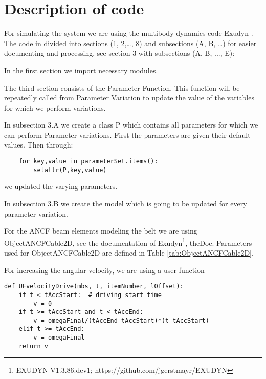 \section{Description of code}
For simulating the system we are using the multibody dynamics code Exudyn \cite{Gerstmayr2022}.
%
The code in divided into sections (1, 2,…, 8) and subsections (A, B, …) for easier documenting and processing, see section 3 with subsections (A, B, ..., E):
\bi 
\item{In the first section we import necessary modules.}
\item{The third section consists of the Parameter Function. This function will be repeatedly called from Parameter Variation to update the value of the variables for which we perform variations.} 
\item{In subsection 3.A we create a class P which contains all parameters for which we can perform Parameter variations. First the parameters are given their default values. Then through:
\pythonstyle
\begin{lstlisting}
	for key,value in parameterSet.items():
		setattr(P,key,value)
\end{lstlisting}		
we updated the varying parameters.}
\item{In subsection 3.B we create the model which is going to be updated for every parameter variation.}
%
%
\item{For the ANCF beam elements modeling the belt we are using ObjectANCFCable2D, see the documentation of Exudyn\footnote{EXUDYN V1.3.86.dev1; https://github.com/jgerstmayr/EXUDYN}, theDoc.
Parameters used for ObjectANCFCable2D are defined in Table \ref{tab:ObjectANCFCable2D}.}
\item{For increasing the angular velocity, we are using a user function
\pythonstyle
\begin{lstlisting}
def UFvelocityDrive(mbs, t, itemNumber, lOffset): 
	if t < tAccStart:  # driving start time
		v = 0
	if t >= tAccStart and t < tAccEnd:
		v = omegaFinal/(tAccEnd-tAccStart)*(t-tAccStart)
	elif t >= tAccEnd:
		v = omegaFinal
	return v
\end{lstlisting}                
}
%
